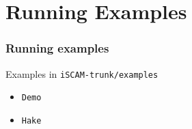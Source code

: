 
\section{Running Examples} %
\label{sec:running_examples}
\begin{frame}
	\frametitle{Running examples}
	Examples in \texttt{iSCAM-trunk/examples}
	\begin{itemize}
		\item \texttt{Demo}
		\item \texttt{Hake}
	\end{itemize}
\end{frame}
